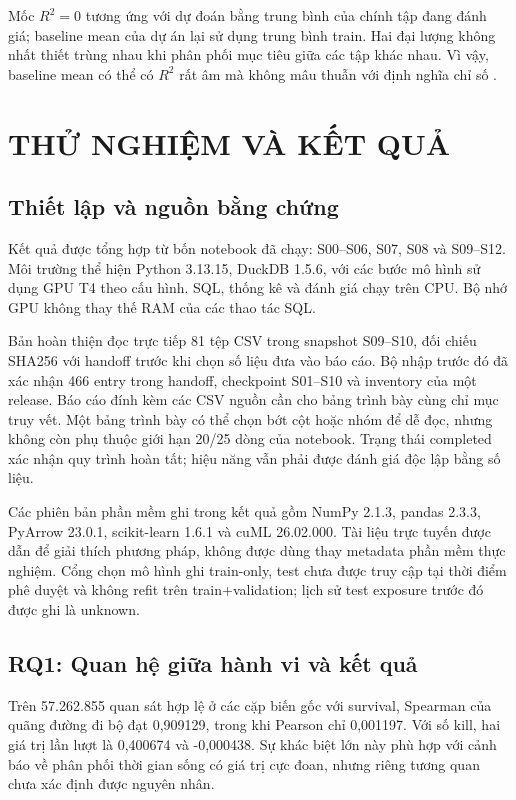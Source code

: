 \documentclass[12pt,a4paper]{article}
\begin{document}
Mốc $R^2=0$ tương ứng với dự đoán bằng trung bình của chính tập đang đánh giá; baseline mean của dự án lại sử dụng trung bình train. Hai đại lượng không nhất thiết trùng nhau khi phân phối mục tiêu giữa các tập khác nhau. Vì vậy, baseline mean có thể có $R^2$ rất âm mà không mâu thuẫn với định nghĩa chỉ số \cite{skmetrics}.
\clearpage
\section{THỬ NGHIỆM VÀ KẾT QUẢ}
\subsection{Thiết lập và nguồn bằng chứng}
Kết quả được tổng hợp từ bốn notebook đã chạy: S00--S06, S07, S08 và S09--S12. Môi trường thể hiện Python 3.13.15, DuckDB 1.5.6, với các bước mô hình sử dụng GPU T4 theo cấu hình. SQL, thống kê và đánh giá chạy trên CPU. Bộ nhớ GPU không thay thế RAM của các thao tác SQL.

Bản hoàn thiện đọc trực tiếp 81 tệp CSV trong snapshot S09--S10, đối chiếu SHA256 với handoff trước khi chọn số liệu đưa vào báo cáo. Bộ nhập trước đó đã xác nhận 466 entry trong handoff, checkpoint S01--S10 và inventory của một release. Báo cáo đính kèm các CSV nguồn cần cho bảng trình bày cùng chỉ mục truy vết. Một bảng trình bày có thể chọn bớt cột hoặc nhóm để dễ đọc, nhưng không còn phụ thuộc giới hạn 20/25 dòng của notebook. Trạng thái completed xác nhận quy trình hoàn tất; hiệu năng vẫn phải được đánh giá độc lập bằng số liệu.

Các phiên bản phần mềm ghi trong kết quả gồm NumPy 2.1.3, pandas 2.3.3, PyArrow 23.0.1, scikit-learn 1.6.1 và cuML 26.02.000. Tài liệu trực tuyến được dẫn để giải thích phương pháp, không được dùng thay metadata phần mềm thực nghiệm. Cổng chọn mô hình ghi train-only, test chưa được truy cập tại thời điểm phê duyệt và không refit trên train+validation; lịch sử test exposure trước đó được ghi là unknown.
\subsection{RQ1: Quan hệ giữa hành vi và kết quả}

Trên 57.262.855 quan sát hợp lệ ở các cặp biến gốc với survival, Spearman của quãng đường đi bộ đạt 0,909129, trong khi Pearson chỉ 0,001197. Với số kill, hai giá trị lần lượt là 0,400674 và -0,000438. Sự khác biệt lớn này phù hợp với cảnh báo về phân phối thời gian sống có giá trị cực đoan, nhưng riêng tương quan chưa xác định được nguyên nhân.
\end{document}
